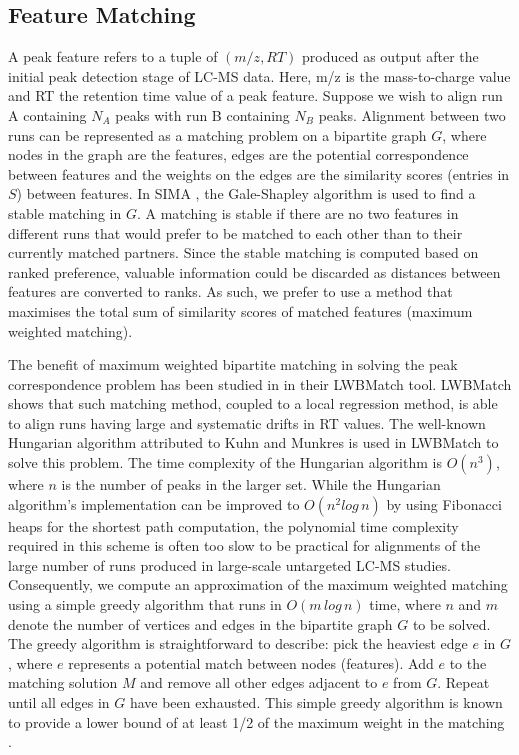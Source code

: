 \subsection{Feature Matching}

A peak feature refers to a tuple of $(m/z,RT)$ produced as output after the initial peak detection stage of LC-MS data. Here, m/z is the mass-to-charge value and RT the retention time value of a peak feature. Suppose we wish to align run A containing $N_A$ peaks with run B containing $N_B$ peaks.  Alignment between two runs can be represented as a matching problem on a bipartite graph $G$, where nodes in the graph are the features, edges are the potential correspondence between features and the weights on the edges are the similarity scores (entries in $S$) between features. In SIMA \cite{Voss2011a}, the Gale-Shapley algorithm \cite{Gusfield1989} is used to find a stable matching in $G$. A matching is stable if there are no two features in different runs that would prefer to be matched to each other than to their currently matched partners. Since the stable matching is computed based on ranked preference, valuable information could be discarded as distances between features are converted to ranks. As such, we prefer to use a method that maximises the total sum of similarity scores of matched features (maximum weighted matching).

The benefit of maximum weighted bipartite matching in solving the peak correspondence problem has been studied in \cite{Wang2013} in their LWBMatch tool. LWBMatch shows that such matching method, coupled to a local regression method, is able to align runs having large and systematic drifts in RT values. The well-known Hungarian algorithm \cite{Kuhn1955} attributed to Kuhn and Munkres is used in LWBMatch to solve this problem. The time complexity of the Hungarian algorithm is $O(n^{3})$, where $n$ is the number of peaks in the larger set. While the Hungarian algorithm's implementation can be improved to $O(n^{2}log\, n)$ by using Fibonacci heaps for the shortest path computation, the polynomial time complexity required in this scheme is often too slow to be practical for alignments of the large number of runs produced in large-scale untargeted LC-MS studies. Consequently, we compute an approximation of the maximum weighted matching using a simple greedy algorithm that runs in $O(m\, log\, n)$ time, where $n$ and $m$ denote the number of vertices and edges in the bipartite graph $G$ to be solved. The greedy algorithm is straightforward to describe: pick the heaviest edge $e$ in $G$, where $e$ represents a potential match between nodes (features). Add $e$ to the matching solution $M$ and remove all other edges adjacent to $e$ from $G$. Repeat until all edges in $G$ have been exhausted. This simple greedy algorithm is known to provide a lower bound of at least 1/2 of the maximum weight in the matching \cite{Maximum2011}. 

